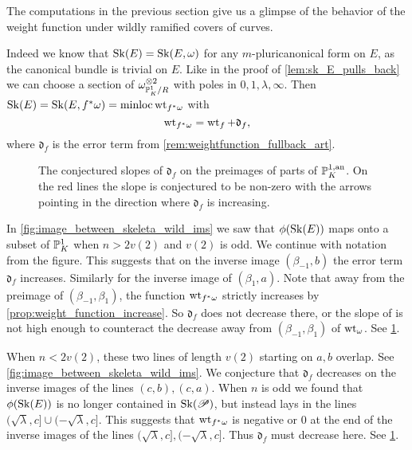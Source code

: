 The computations in the previous section give us a glimpse of the behavior of the weight function under wildly ramified covers of curves. 

Indeed we know that $\operatorname{Sk}(E) = \operatorname{Sk}(E, \omega)$ for any $m$-pluricanonical form on $E$, as the canonical bundle is trivial on $E$. 
Like in the proof of \cref{lem:sk_E_pulls_back} we can choose a section of $\omega_{\mathbb{P}^{1}_K  / R} ^{\otimes 2}$ with poles in $0, 1, \lambda, \infty$. 
Then $\operatorname{Sk}(E) = \operatorname{Sk}(E, f^*\omega) = \operatorname{minloc} \operatorname{wt}_{f^* \omega}$ with \[
\operatorname{wt}_{f^*\omega} = \operatorname{wt}_{f} + \mathfrak{d}_f
,\] 
where $\mathfrak{d}_f $ is the error term from \cref{rem:weightfunction_fullback_art}. 

\begin{figure}[ht]
    \centering
    \caption{The conjectured slopes of $\mathfrak{d} _f$ on the preimages of parts of $\mathbb{P}^{1, \text{an}}_K$.
    On the red lines the slope is conjectured to be non-zero with the arrows pointing in the direction where $\mathfrak{d}_f $ is increasing. }
    \label{fig:slope_log_different}
\end{figure}

In \cref{fig:image_between_skeleta_wild_ims} we saw that $\phi(\sk(E))$ maps onto a subset of  $\mathbb{P}^{1}_K$ when $n > 2v(2)$ and $v(2)$ is odd. We continue with notation from the figure.
This suggests that on the inverse image $(\beta_{-1}, b)$ the error term $\mathfrak{d}_f $ increases. 
Similarly for the inverse image of  $(\beta_1, a)$. 
Note that away from the preimage of $(\beta_{-1}, \beta_1)$, the function $\operatorname{wt}_{f^*\omega}$ strictly increases by \cref{prop:weight_function_increase}.
So $\mathfrak{d} _f$ does not decrease there, or the slope of is not high enough to counteract the decrease away from $(\beta_{-1}, \beta_1)$ of $\operatorname{wt}_{\omega}$. 
See \cref{fig:slope_log_different}.

When $n < 2v(2)$, these two lines of length $v(2)$ starting on $a, b$ overlap. See \cref{fig:image_between_skeleta_wild_ims}. 
We conjecture that $\mathfrak{d} _f$ decreases on the inverse images of the lines $(c, b), (c, a)$. 
When $n$ is odd we found that $\phi(\sk(E))$ is no longer contained in $\operatorname{Sk}(\mathscr P)$, but instead lays in the lines $(\sqrt{\lambda}, c]\cup (-\sqrt{\lambda} , c]  $. 
This suggests that $\operatorname{wt}_{f^*\omega}$ is negative or 0 at the end of the inverse images of the lines $(\sqrt{\lambda}, c], (-\sqrt{\lambda}, c]$. 
Thus $\mathfrak{d} _f$ must decrease here. 
See \cref{fig:slope_log_different}.



 
